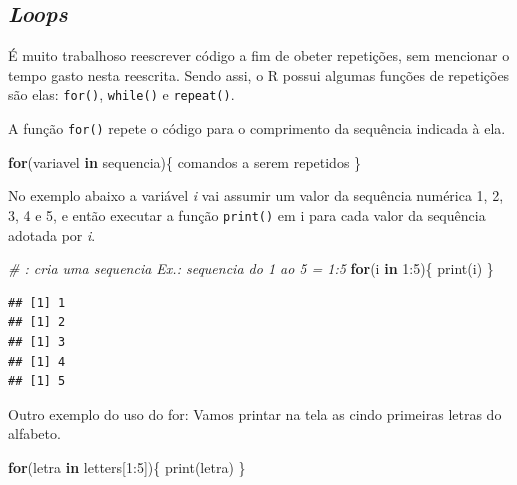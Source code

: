 \documentclass[
]{book}
\newenvironment{Shaded}{\begin{snugshade}}{\end{snugshade}}
\newcommand{\CommentTok}[1]{\textcolor[rgb]{0.56,0.35,0.01}{\textit{#1}}}
\newcommand{\ControlFlowTok}[1]{\textcolor[rgb]{0.13,0.29,0.53}{\textbf{#1}}}
\newcommand{\DecValTok}[1]{\textcolor[rgb]{0.00,0.00,0.81}{#1}}
\newcommand{\FunctionTok}[1]{\textcolor[rgb]{0.00,0.00,0.00}{#1}}
\newcommand{\NormalTok}[1]{#1}
\newcommand{\SpecialCharTok}[1]{\textcolor[rgb]{0.00,0.00,0.00}{#1}}
\begin{document}
\hypertarget{loops}{%
\subsection{\texorpdfstring{\emph{Loops}}{Loops}}\label{loops}}

É muito trabalhoso reescrever código a fim de obeter repetições, sem mencionar o tempo gasto nesta reescrita. Sendo assi, o R possui algumas funções de repetições são elas: \texttt{for()}, \texttt{while()} e \texttt{repeat()}.

A função \texttt{for()} repete o código para o comprimento da sequência indicada à ela.

\begin{Shaded}
\begin{Highlighting}[]
\ControlFlowTok{for}\NormalTok{(variavel }\ControlFlowTok{in}\NormalTok{ sequencia)\{}
\NormalTok{  comandos a serem repetidos}
\NormalTok{\}}
\end{Highlighting}
\end{Shaded}

No exemplo abaixo a variável \emph{i} vai assumir um valor da sequência numérica 1, 2, 3, 4 e 5, e então executar a função \texttt{print()} em i para cada valor da sequência adotada por \emph{i}.

\begin{Shaded}
\begin{Highlighting}[]
\CommentTok{\# : cria uma sequencia Ex.: sequencia do 1 ao 5 = 1:5}
\ControlFlowTok{for}\NormalTok{(i }\ControlFlowTok{in} \DecValTok{1}\SpecialCharTok{:}\DecValTok{5}\NormalTok{)\{ }
  \FunctionTok{print}\NormalTok{(i)}
\NormalTok{\}}
\end{Highlighting}
\end{Shaded}

\begin{verbatim}
## [1] 1
## [1] 2
## [1] 3
## [1] 4
## [1] 5
\end{verbatim}

Outro exemplo do uso do for: Vamos printar na tela as cindo primeiras letras do alfabeto.

\begin{Shaded}
\begin{Highlighting}[]
\ControlFlowTok{for}\NormalTok{(letra }\ControlFlowTok{in}\NormalTok{ letters[}\DecValTok{1}\SpecialCharTok{:}\DecValTok{5}\NormalTok{])\{}
  \FunctionTok{print}\NormalTok{(letra)}
\NormalTok{\}}
\end{Highlighting}
\end{Shaded}
\end{document}
